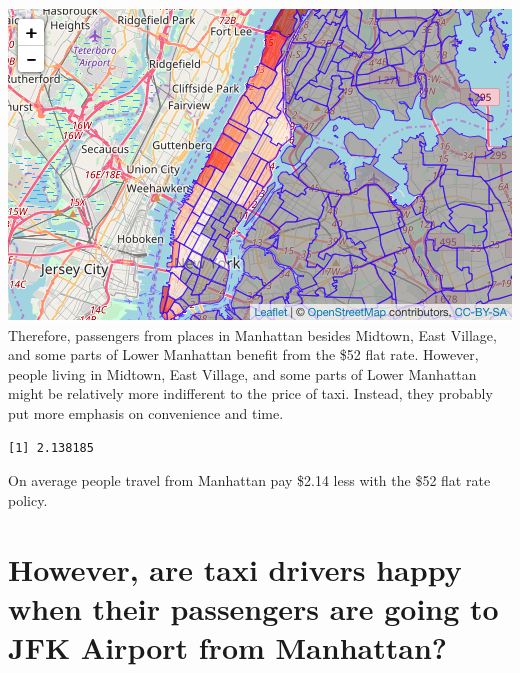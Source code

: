 \documentclass[12pt,twoside]{reedthesis}
\newenvironment{Shaded}{\begin{snugshade}}{\end{snugshade}}
\newcommand{\KeywordTok}[1]{\textcolor[rgb]{0.13,0.29,0.53}{\textbf{#1}}}
\newcommand{\OperatorTok}[1]{\textcolor[rgb]{0.81,0.36,0.00}{\textbf{#1}}}
\newcommand{\NormalTok}[1]{#1}
\theoremstyle{definition}
\theoremstyle{definition}
\theoremstyle{definition}
\theoremstyle{remark}
\begin{document}
\includegraphics{figure/to_jfk_fare_above.png} Therefore, passengers
from places in Manhattan besides Midtown, East Village, and some parts
of Lower Manhattan benefit from the \$52 flat rate. However, people
living in Midtown, East Village, and some parts of Lower Manhattan might
be relatively more indifferent to the price of taxi. Instead, they
probably put more emphasis on convenience and time.
\begin{Shaded}
\end{Shaded}
\begin{verbatim}
[1] 2.138185
\end{verbatim}
On average people travel from Manhattan pay \$2.14 less with the \$52
flat rate policy.

\section{However, are taxi drivers happy when their passengers are going
to JFK Airport from
Manhattan?}\label{however-are-taxi-drivers-happy-when-their-passengers-are-going-to-jfk-airport-from-manhattan}
\end{document}
